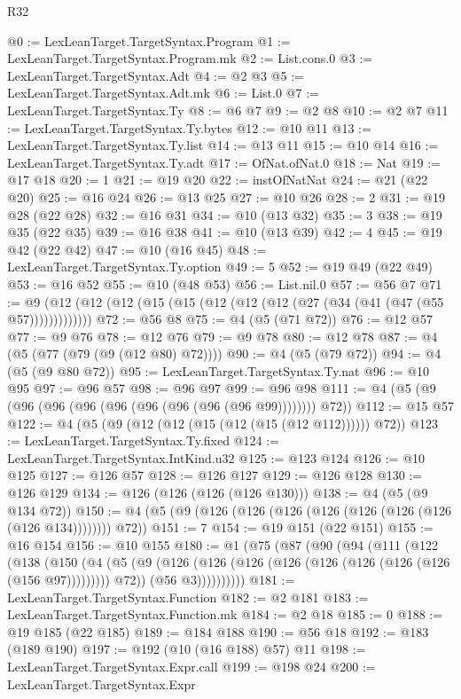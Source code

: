 \begin{lexlean}{R32}
\begin{coremodule}
@0 := LexLeanTarget.TargetSyntax.Program
@1 := LexLeanTarget.TargetSyntax.Program.mk
@2 := List.cons.{0}
@3 := LexLeanTarget.TargetSyntax.Adt
@4 := @2 @3
@5 := LexLeanTarget.TargetSyntax.Adt.mk
@6 := List.{0}
@7 := LexLeanTarget.TargetSyntax.Ty
@8 := @6 @7
@9 := @2 @8
@10 := @2 @7
@11 := LexLeanTarget.TargetSyntax.Ty.bytes
@12 := @10 @11
@13 := LexLeanTarget.TargetSyntax.Ty.list
@14 := @13 @11
@15 := @10 @14
@16 := LexLeanTarget.TargetSyntax.Ty.adt
@17 := OfNat.ofNat.{0}
@18 := Nat
@19 := @17 @18
@20 := 1
@21 := @19 @20
@22 := instOfNatNat
@24 := @21 (@22 @20)
@25 := @16 @24
@26 := @13 @25
@27 := @10 @26
@28 := 2
@31 := @19 @28 (@22 @28)
@32 := @16 @31
@34 := @10 (@13 @32)
@35 := 3
@38 := @19 @35 (@22 @35)
@39 := @16 @38
@41 := @10 (@13 @39)
@42 := 4
@45 := @19 @42 (@22 @42)
@47 := @10 (@16 @45)
@48 := LexLeanTarget.TargetSyntax.Ty.option
@49 := 5
@52 := @19 @49 (@22 @49)
@53 := @16 @52
@55 := @10 (@48 @53)
@56 := List.nil.{0}
@57 := @56 @7
@71 := @9 (@12 (@12 (@12 (@15 (@15 (@12 (@12 (@12 (@27 (@34 (@41 (@47 (@55 @57)))))))))))))
@72 := @56 @8
@75 := @4 (@5 (@71 @72))
@76 := @12 @57
@77 := @9 @76
@78 := @12 @76
@79 := @9 @78
@80 := @12 @78
@87 := @4 (@5 (@77 (@79 (@9 (@12 @80) @72))))
@90 := @4 (@5 (@79 @72))
@94 := @4 (@5 (@9 @80 @72))
@95 := LexLeanTarget.TargetSyntax.Ty.nat
@96 := @10 @95
@97 := @96 @57
@98 := @96 @97
@99 := @96 @98
@111 := @4 (@5 (@9 (@96 (@96 (@96 (@96 (@96 (@96 (@96 (@96 @99)))))))) @72))
@112 := @15 @57
@122 := @4 (@5 (@9 (@12 (@12 (@15 (@12 (@15 (@12 @112)))))) @72))
@123 := LexLeanTarget.TargetSyntax.Ty.fixed
@124 := LexLeanTarget.TargetSyntax.IntKind.u32
@125 := @123 @124
@126 := @10 @125
@127 := @126 @57
@128 := @126 @127
@129 := @126 @128
@130 := @126 @129
@134 := @126 (@126 (@126 (@126 @130)))
@138 := @4 (@5 (@9 @134 @72))
@150 := @4 (@5 (@9 (@126 (@126 (@126 (@126 (@126 (@126 (@126 (@126 @134)))))))) @72))
@151 := 7
@154 := @19 @151 (@22 @151)
@155 := @16 @154
@156 := @10 @155
@180 := @1
    (@75
      (@87
        (@90
          (@94
            (@111
              (@122
                (@138
                  (@150
                    (@4
                      (@5
                        (@9 (@126 (@126 (@126 (@126 (@126 (@126 (@126 (@126 (@156 @97))))))))) @72))
                      (@56 @3))))))))))
@181 := LexLeanTarget.TargetSyntax.Function
@182 := @2 @181
@183 := LexLeanTarget.TargetSyntax.Function.mk
@184 := @2 @18
@185 := 0
@188 := @19 @185 (@22 @185)
@189 := @184 @188
@190 := @56 @18
@192 := @183 (@189 @190)
@197 := @192 (@10 (@16 @188) @57) @11
@198 := LexLeanTarget.TargetSyntax.Expr.call
@199 := @198 @24
@200 := LexLeanTarget.TargetSyntax.Expr

\end{coremodule}
\end{lexlean}

